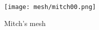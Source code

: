 
\label{sec:performance}


\begin{figure}[htb]
    \centering
    \texttt{[image: mesh/mitch00.png]}
    \caption{Mitch's mesh}
    \label{fig:mitch}
\end{figure}

